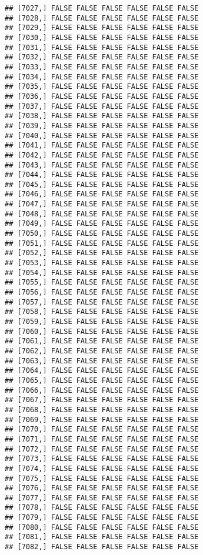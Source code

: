 \documentclass[
]{article}
\begin{document}
\begin{verbatim}
## [7027,] FALSE FALSE FALSE FALSE FALSE FALSE
## [7028,] FALSE FALSE FALSE FALSE FALSE FALSE
## [7029,] FALSE FALSE FALSE FALSE FALSE FALSE
## [7030,] FALSE FALSE FALSE FALSE FALSE FALSE
## [7031,] FALSE FALSE FALSE FALSE FALSE FALSE
## [7032,] FALSE FALSE FALSE FALSE FALSE FALSE
## [7033,] FALSE FALSE FALSE FALSE FALSE FALSE
## [7034,] FALSE FALSE FALSE FALSE FALSE FALSE
## [7035,] FALSE FALSE FALSE FALSE FALSE FALSE
## [7036,] FALSE FALSE FALSE FALSE FALSE FALSE
## [7037,] FALSE FALSE FALSE FALSE FALSE FALSE
## [7038,] FALSE FALSE FALSE FALSE FALSE FALSE
## [7039,] FALSE FALSE FALSE FALSE FALSE FALSE
## [7040,] FALSE FALSE FALSE FALSE FALSE FALSE
## [7041,] FALSE FALSE FALSE FALSE FALSE FALSE
## [7042,] FALSE FALSE FALSE FALSE FALSE FALSE
## [7043,] FALSE FALSE FALSE FALSE FALSE FALSE
## [7044,] FALSE FALSE FALSE FALSE FALSE FALSE
## [7045,] FALSE FALSE FALSE FALSE FALSE FALSE
## [7046,] FALSE FALSE FALSE FALSE FALSE FALSE
## [7047,] FALSE FALSE FALSE FALSE FALSE FALSE
## [7048,] FALSE FALSE FALSE FALSE FALSE FALSE
## [7049,] FALSE FALSE FALSE FALSE FALSE FALSE
## [7050,] FALSE FALSE FALSE FALSE FALSE FALSE
## [7051,] FALSE FALSE FALSE FALSE FALSE FALSE
## [7052,] FALSE FALSE FALSE FALSE FALSE FALSE
## [7053,] FALSE FALSE FALSE FALSE FALSE FALSE
## [7054,] FALSE FALSE FALSE FALSE FALSE FALSE
## [7055,] FALSE FALSE FALSE FALSE FALSE FALSE
## [7056,] FALSE FALSE FALSE FALSE FALSE FALSE
## [7057,] FALSE FALSE FALSE FALSE FALSE FALSE
## [7058,] FALSE FALSE FALSE FALSE FALSE FALSE
## [7059,] FALSE FALSE FALSE FALSE FALSE FALSE
## [7060,] FALSE FALSE FALSE FALSE FALSE FALSE
## [7061,] FALSE FALSE FALSE FALSE FALSE FALSE
## [7062,] FALSE FALSE FALSE FALSE FALSE FALSE
## [7063,] FALSE FALSE FALSE FALSE FALSE FALSE
## [7064,] FALSE FALSE FALSE FALSE FALSE FALSE
## [7065,] FALSE FALSE FALSE FALSE FALSE FALSE
## [7066,] FALSE FALSE FALSE FALSE FALSE FALSE
## [7067,] FALSE FALSE FALSE FALSE FALSE FALSE
## [7068,] FALSE FALSE FALSE FALSE FALSE FALSE
## [7069,] FALSE FALSE FALSE FALSE FALSE FALSE
## [7070,] FALSE FALSE FALSE FALSE FALSE FALSE
## [7071,] FALSE FALSE FALSE FALSE FALSE FALSE
## [7072,] FALSE FALSE FALSE FALSE FALSE FALSE
## [7073,] FALSE FALSE FALSE FALSE FALSE FALSE
## [7074,] FALSE FALSE FALSE FALSE FALSE FALSE
## [7075,] FALSE FALSE FALSE FALSE FALSE FALSE
## [7076,] FALSE FALSE FALSE FALSE FALSE FALSE
## [7077,] FALSE FALSE FALSE FALSE FALSE FALSE
## [7078,] FALSE FALSE FALSE FALSE FALSE FALSE
## [7079,] FALSE FALSE FALSE FALSE FALSE FALSE
## [7080,] FALSE FALSE FALSE FALSE FALSE FALSE
## [7081,] FALSE FALSE FALSE FALSE FALSE FALSE
## [7082,] FALSE FALSE FALSE FALSE FALSE FALSE

\end{verbatim}
\end{document}

